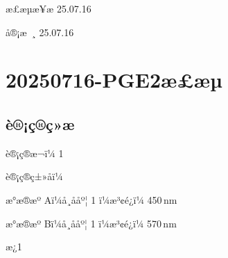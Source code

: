 \documentclass[UTF8,10pt,a4paper,fontset=fandol]{ctexart}
\newcommand{\fieldvalue}[1]{#1}
\newcommand{\handwritten}[1]{#1}
\begin{document}
\handwritten{æ£æµæ¥æ 25.07.16}

\handwritten{å®¡æ ¸ 25.07.16}

\newpage

\section*{20250716-PGE2æ£æµ}

\subsection*{è®¡ç®ç»æ}

è®¡ç®æ¬ï¼%
\fieldvalue{1}

è®¡ç®ç±»åï¼%

æ°æ®æº Aï¼å¸ååº¦%
\fieldvalue{1}
ï¼æ³¢é¿ï¼%
\fieldvalue{450\,nm}

æ°æ®æº Bï¼å¸ååº¦%
\fieldvalue{1}
ï¼æ³¢é¿ï¼%
\fieldvalue{570\,nm}

æ¿1
\end{document}
